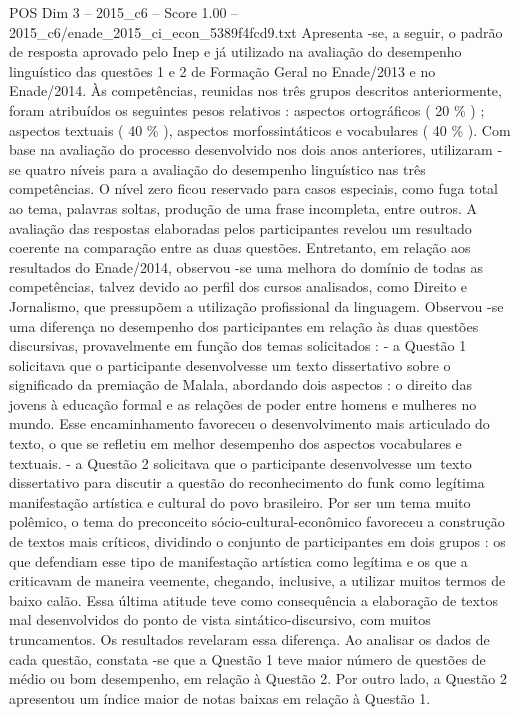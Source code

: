 \begin{textsample}{POS Dim 3 – 2015\_c6 – Score 1.00 – 2015\_c6/enade\_2015\_ci\_econ\_5389f4fcd9.txt}
Apresenta -se, a seguir, o padrão de resposta aprovado pelo Inep e já utilizado na avaliação do desempenho linguístico das questões 1 e 2 de Formação Geral no Enade/2013 e no Enade/2014.
Às competências, reunidas nos três grupos descritos anteriormente, foram atribuídos os seguintes pesos relativos : aspectos ortográficos ( 20 \% ) ; aspectos textuais ( 40 \% ), aspectos morfossintáticos e vocabulares ( 40 \% ).
Com base na avaliação do processo desenvolvido nos dois anos anteriores, utilizaram -se quatro níveis para a avaliação do desempenho linguístico nas três competências.
O nível zero ficou reservado para casos especiais, como fuga total ao tema, palavras soltas, produção de uma frase incompleta, entre outros.
A avaliação das respostas elaboradas pelos participantes revelou um resultado coerente na comparação entre as duas questões.
Entretanto, em relação aos resultados do Enade/2014, observou -se uma melhora do domínio de todas as competências, talvez devido ao perfil dos cursos analisados, como Direito e Jornalismo, que pressupõem a utilização profissional da linguagem.
Observou -se uma diferença no desempenho dos participantes em relação às duas questões discursivas, provavelmente em função dos temas solicitados : - a Questão 1 solicitava que o participante desenvolvesse um texto dissertativo sobre o significado da premiação de Malala, abordando dois aspectos : o direito das jovens à educação formal e as relações de poder entre homens e mulheres no mundo.
Esse encaminhamento favoreceu o desenvolvimento mais articulado do texto, o que se refletiu em melhor desempenho dos aspectos vocabulares e textuais. - a Questão 2 solicitava que o participante desenvolvesse um texto dissertativo para discutir a questão do reconhecimento do funk como legítima manifestação artística e cultural do povo brasileiro.
Por ser um tema muito polêmico, o tema do preconceito sócio-cultural-econômico favoreceu a construção de textos mais críticos, dividindo o conjunto de participantes em dois grupos : os que defendiam esse tipo de manifestação artística como legítima e os que a criticavam de maneira veemente, chegando, inclusive, a utilizar muitos termos de baixo calão.
Essa última atitude teve como consequência a elaboração de textos mal desenvolvidos do ponto de vista sintático-discursivo, com muitos truncamentos.
Os resultados revelaram essa diferença.
Ao analisar os dados de cada questão, constata -se que a Questão 1 teve maior número de questões de médio ou bom desempenho, em relação à Questão 2.
Por outro lado, a Questão 2 apresentou um índice maior de notas baixas em relação à Questão 1.

\end{textsample}

